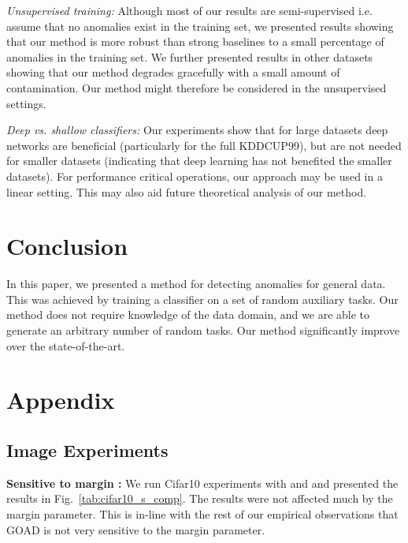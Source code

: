 \documentclass{article} \usepackage{iclr2020_conference,times}
\begin{document}
\textit{Unsupervised training:} Although most of our results are semi-supervised i.e. assume that no anomalies exist in the training set, we presented results showing that our method is more robust than strong baselines to a small percentage of anomalies in the training set. We further presented results in other datasets showing that our method degrades gracefully with a small amount of contamination. Our method might therefore be considered in the unsupervised settings.

\textit{Deep vs. shallow classifiers:} Our experiments show that for large datasets deep networks are beneficial (particularly for the full KDDCUP99), but are not needed for smaller datasets (indicating that deep learning has not benefited the smaller datasets). For performance critical operations, our approach may be used in a linear setting. This may also aid future theoretical analysis of our method.

\section{Conclusion}
\label{sec:conc}

In this paper, we presented a method for detecting anomalies for general  data. This was achieved by training a classifier on a set of random auxiliary tasks. Our method does not require knowledge of the data domain, and we are able to generate an arbitrary number of random tasks. Our method significantly improve over the state-of-the-art.





\appendix
\section{Appendix}

\subsection{Image Experiments}
\label{app:image}

\textbf{Sensitive to margin :} We run Cifar10 experiments with  and  and presented the results in Fig.~\ref{tab:cifar10_s_comp}. The results were not affected much by the margin parameter. This is in-line with the rest of our empirical observations that GOAD is not very sensitive to the margin parameter.
\end{document}
